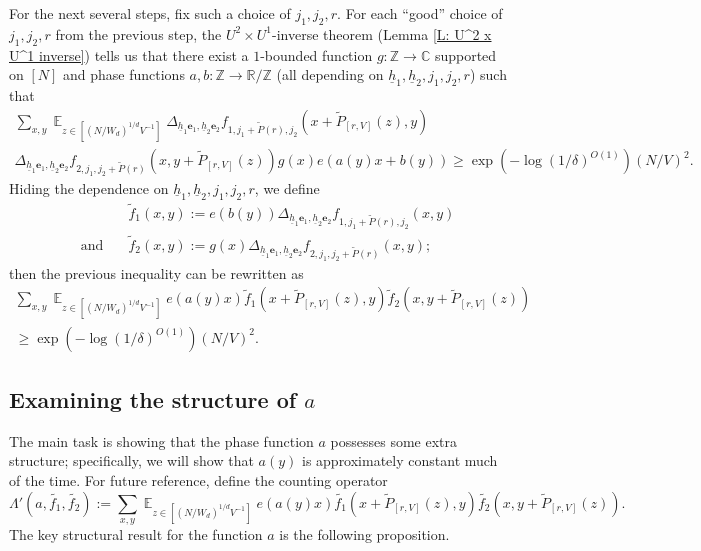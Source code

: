 \documentclass[11pt]{amsart}
\theoremstyle{definition}
\DeclareMathOperator*{\E}{\mathbb{E}}
\newcommand{\Z}{{\mathbb Z}}
\newcommand{\be}{{\mathbf{e}}}
\newcommand{\uh}{{\underline{h}}}
\begin{document}
For the next several steps, fix such a choice of $j_1,j_2,r$.
For each ``good'' choice of $j_1,j_2,r$ from the previous step, the $U^2 \times U^1$-inverse theorem (Lemma \ref{L: U^2 x U^1 inverse}) tells us that there exist a $1$-bounded function $g: \mathbb{Z} \to \mathbb{C}$ supported on $[N]$ and phase functions $a,b: \Z \to \mathbb{R}/\mathbb{Z}$ (all depending on $\uh_1,\uh_2, j_1,j_2,r$) such that
\begin{multline*}
\sum_{x,y}\E_{z \in [(N/W_d)^{1/d}V^{-1}]} \Delta_{\uh_1 \be_1,\uh_2 \be_2} f_{1,j_1+\widetilde P(r),j_2}(x+\widetilde P_{[r, V]}(z),y)\\
\Delta_{\uh_1 \be_1,\uh_2 \be_2} f_{2,j_1, j_2+\widetilde P(r)}(x,y+\widetilde P_{[r, V]}(z)) 
g(x)e(a(y)x+b(y))\geq \exp(-\log(1/\delta)^{O(1)}) (N/V)^2.
\end{multline*}
Hiding the dependence on $\uh_1, \uh_2, j_1,j_2,r$, we define
\begin{align*}
    &\widetilde f_1(x,y):=e(b(y))\Delta_{\uh_1 \be_1,\uh_2 \be_2} f_{1,j_1+\widetilde P(r),j_2}(x,y)\\
    \quad \text{and} \quad &\widetilde f_2(x,y):=g(x)\Delta_{\uh_1 \be_1,\uh_2 \be_2} f_{2,j_1, j_2+\widetilde P(r)}(x,y);
\end{align*}
then the previous inequality can be rewritten as
\begin{multline*}
    \sum_{x,y}\E_{z \in [(N/W_d)^{1/d}V^{-1}]} e(a(y)x) \widetilde f_1(x+\widetilde P_{[r, V]}(z),y) \widetilde f_2(x,y+\widetilde P_{[r, V]}(z))\\
    \geq \exp(-\log(1/\delta)^{O(1)}) (N/V)^2.
\end{multline*}

\subsection{Examining the structure of $a$}

The main task is showing that the phase function $a$ possesses some extra structure; specifically, we will show that $a(y)$ is approximately constant much of the time.  For future reference, define the counting operator
$$\Lambda'(a,\widetilde{f_1},\widetilde{f_2}):=\sum_{x,y} \E_{z \in [(N/W_d)^{1/d}V^{-1}]} e(a(y)x) \widetilde{f_1}(x+\widetilde P_{[r, V]}(z),y) \widetilde{f_2}(x,y+\widetilde P_{[r, V]}(z)).$$
The key structural result for the function $a$ is the following proposition.
\end{document}
